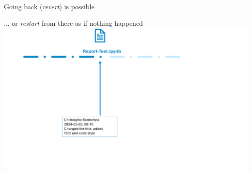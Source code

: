 \documentclass[xcolor=x11names,compress]{beamer}
\renewcommand{\(}{\begin{columns}}
\renewcommand{\)}{\end{columns}}
\newcommand{\<}[1]{\begin{column}{#1}}
\renewcommand{\>}{\end{column}}
\begin{document}
\begin{frame}{Going back (\emph{revert}) is possible}
\begin{center}
\begin{itemize}
    {... or \emph{restart} from there as if nothing happened }
    {\includegraphics[width = 1.0\textwidth]{FileLifeRevert2.png} \\ }

\end{itemize}
\end{center}
\end{frame}
\end{document}
